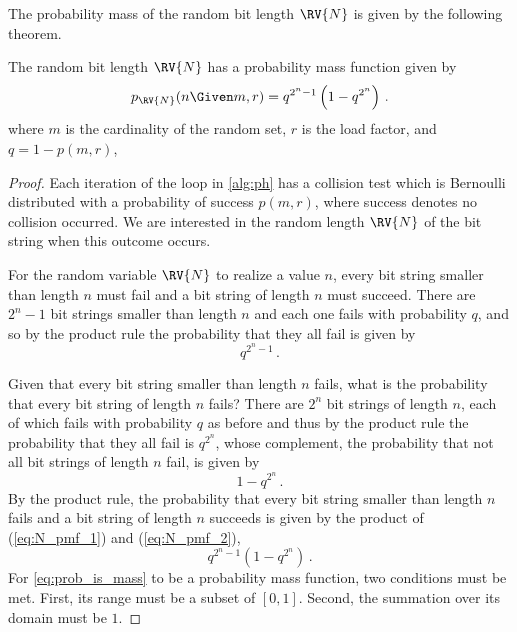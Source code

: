 \documentclass[ ../main.tex]{subfiles}
\begin{document}
The probability mass of the random bit length $\RV{N}$ is given by the following theorem.
\begin{theorem}
\label{thm:N_pmf}
The random bit length $\RV{N}$ has a probability mass function given by
\begin{equation}
\label{eq:N_pmf}
    \pmf_{\RV{N}}(n \Given m, r) = q^{2^n-1}\left(1 - q^{2^n}\right)\,.
\end{equation}
where $m$ is the cardinality of the random set, $r$ is the load factor, and $q = 1 - p(m,r)$, 
\end{theorem}
\begin{proof}
Each iteration of the loop in \cref{alg:ph} has a collision test which is Bernoulli distributed with a probability of success $p(m,r)$, where success denotes no collision occurred. We are interested in the random length $\RV{N}$ of the bit string when this outcome occurs.

For the random variable $\RV{N}$ to realize a value $n$, every bit string smaller than length $n$ must fail and a bit string of length $n$ must succeed. There are $2^n-1$ bit strings smaller than length $n$ and each one fails with probability $q$, and so by the product rule the probability that they all fail is given by
\begin{equation}
\label{eq:N_pmf_1}
    q^{2^n - 1}\,.
\end{equation}

Given that every bit string smaller than length $n$ fails, what is the probability that every bit string of length $n$ fails? There are $2^n$ bit strings of length $n$, each of which fails with probability $q$ as before and thus by the product rule the probability that they all fail is $q^{2^n}$, whose complement, the probability that not all bit strings of length $n$ fail, is given by
\begin{equation}
\label{eq:N_pmf_2}
    1 - q^{2^n}\,.
\end{equation}
By the product rule, the probability that every bit string smaller than length $n$ fails and a bit string of length $n$ succeeds is given by the product of (\ref{eq:N_pmf_1}) and (\ref{eq:N_pmf_2}),
\begin{equation}
\label{eq:prob_is_mass}
    q^{2^n-1}\left(1 - q^{2^n}\right)\,.
\end{equation}
For \cref{eq:prob_is_mass} to be a probability mass function, two conditions must be met. First, its range must be a subset of $[0,1]$. Second, the summation over its domain must be $1$.


\end{proof}
\end{document}
